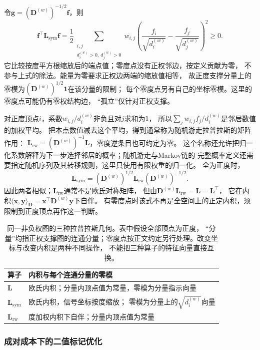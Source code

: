 令\(\bm g=(\bm D^{(w)})^{-1/2}\bm f\)，则
\[
  \bm f^\top\bm L_{\mathrm{sym}}\bm f
  =\frac12\sum_{\substack{i,j\\d_i^{(w)}>0,\ d_j^{(w)}>0}}
    w_{i,j}\left(\frac{f_i}{\sqrt{d_i^{(w)}}}
      -\frac{f_j}{\sqrt{d_j^{(w)}}}\right)^2\geq0.
\]
它比较按度平方根缩放后的端点值；零度点没有正权邻边，按定义贡献为零，
不参与上式的除法。能量为零要求正权边两端的缩放值相等，
故正度支撑分量上的零模为\((\bm D^{(w)})^{1/2}\bm1\)在该分量的限制；
每个零度点另有自己的坐标零模。这里的零度点可能仍有零权结构边，
“孤立”仅针对正权支撑。

对正度顶点\(i\)，系数\(w_{i,j}/d_i^{(w)}\)非负且对\(j\)求和为\(1\)，
所以\(\sum_j w_{i,j}f_j/d_i^{(w)}\)是邻居数值的加权平均。
把本点数值减去这个平均，得到通常称为随机游走拉普拉斯的矩阵作用：
\(\bm L_{\mathrm{rw}}=(\bm D^{(w)})^{-1}\bm L\)，零度逆条目也可约定为零。
这个名称还允许把归一化系数解释为下一步选择邻居的概率；随机游走与Markov链的
完整概率定义还需要指定随机序列及其转移规则，这里只使用有限权重的归一化。
全为正度时，
\[
  \bm L_{\mathrm{sym}}
  =(\bm D^{(w)})^{1/2}\bm L_{\mathrm{rw}}(\bm D^{(w)})^{-1/2}.
\]
因此两者相似；\(\bm L_{\mathrm{rw}}\)通常不是欧氏对称矩阵，
但由\(\bm D^{(w)}\bm L_{\mathrm{rw}}=\bm L=\bm L^\top\)，
它在内积\(\langle\bm x,\bm y\rangle_{\bm D}
=\bm x^\top\bm D^{(w)}\bm y\)下自伴。
有零度点时该式不再是全空间上的正定内积，须限制到正度顶点再作这一判断。

\begin{table}[htbp]
  \centering\small
  \begin{tabularx}{\linewidth}{@{}lX@{}}
    \toprule
    算子 & 内积与每个连通分量的零模\\
    \midrule
    \(\bm L\) & 欧氏内积；分量内顶点值为常量，零模为分量指示向量\\
    \(\bm L_{\mathrm{sym}}\) & 欧氏内积，信号坐标按度缩放；
      零模为分量上的\(\sqrt{d_i^{(w)}}\)向量\\
    \(\bm L_{\mathrm{rw}}\) & 度加权内积下自伴；分量内顶点值为常量\\
    \bottomrule
  \end{tabularx}
  \caption{同一非负权图的三种拉普拉斯几何。表中假设全部顶点为正度，
  “分量”均指正权支撑图的连通分量；零度点按正文约定另行处理。改变坐标与改变内积是两种不同操作，
  不能把三种算子的特征向量直接互换。}
  \label{tab:graph-theory-laplacian-geometries}
\end{table}

\subsubsection{成对成本下的二值标记优化}

